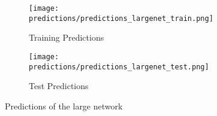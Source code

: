 \begin{figure}[h!]
	\centering
	
	\begin{subfigure}[t]{0.5\textwidth}
		\centering
		\texttt{[image: predictions/predictions\_largenet\_train.png]}
		\caption{Training Predictions}
		\label{fig:predictions_largenet_training}
	\end{subfigure}
	\begin{subfigure}[t]{0.49\textwidth}
		\centering
		\texttt{[image: predictions/predictions\_largenet\_test.png]}
		\caption{Test Predictions}
		\label{fig:predictions_largenet_test}
	\end{subfigure}
	
	\caption{Predictions of the large network}
	\label{fig:predictions_largenet}
\end{figure}
